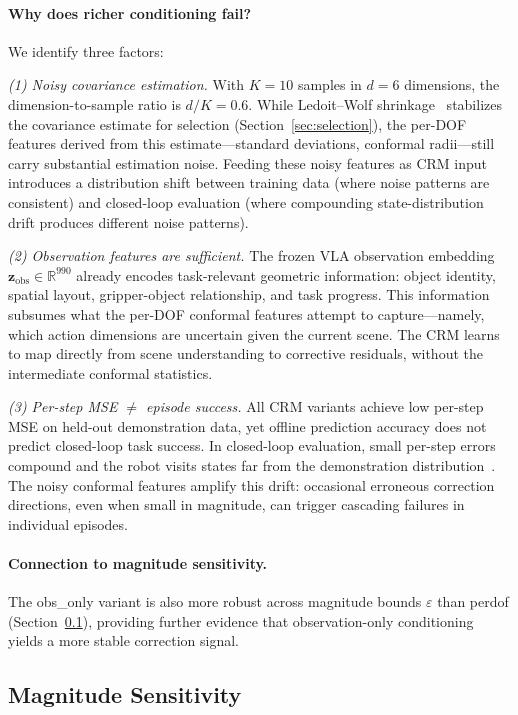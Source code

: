 \paragraph{Why does richer conditioning fail?}
We identify three factors:

\emph{(1) Noisy covariance estimation.}
With $K{=}10$ samples in $d{=}6$ dimensions, the dimension-to-sample ratio is $d/K = 0.6$.
While Ledoit--Wolf shrinkage~\cite{ledoit2004well} stabilizes the covariance estimate for selection (Section~\ref{sec:selection}), the per-DOF features derived from this estimate---standard deviations, conformal radii---still carry substantial estimation noise.
Feeding these noisy features as CRM input introduces a distribution shift between training data (where noise patterns are consistent) and closed-loop evaluation (where compounding state-distribution drift produces different noise patterns).

\emph{(2) Observation features are sufficient.}
The frozen VLA observation embedding $\mathbf{z}_{\mathrm{obs}} \in \mathbb{R}^{990}$ already encodes task-relevant geometric information: object identity, spatial layout, gripper-object relationship, and task progress.
This information subsumes what the per-DOF conformal features attempt to capture---namely, which action dimensions are uncertain given the current scene.
The CRM learns to map directly from scene understanding to corrective residuals, without the intermediate conformal statistics.

\emph{(3) Per-step MSE $\neq$ episode success.}
All CRM variants achieve low per-step MSE on held-out demonstration data, yet offline prediction accuracy does not predict closed-loop task success.
In closed-loop evaluation, small per-step errors compound and the robot visits states far from the demonstration distribution~\cite{ross2011dagger}.
The noisy conformal features amplify this drift: occasional erroneous correction directions, even when small in magnitude, can trigger cascading failures in individual episodes.

\paragraph{Connection to magnitude sensitivity.}
The obs\_only variant is also more robust across magnitude bounds $\varepsilon$ than perdof (Section~\ref{sec:magnitude_results}), providing further evidence that observation-only conditioning yields a more stable correction signal.


\subsection{Magnitude Sensitivity}
\label{sec:magnitude_results}

